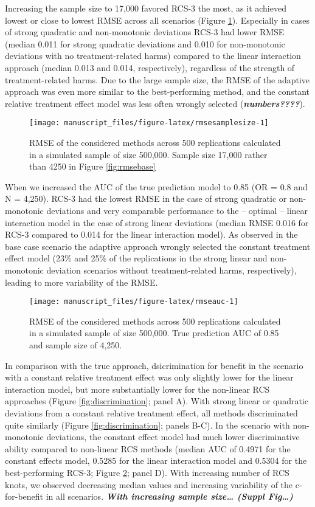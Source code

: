 \documentclass[]{elsarticle} %
\begin{document}
Increasing the sample size to 17,000 favored RCS-3 the most, as it
achieved lowest or close to lowest RMSE across all scenarios (Figure
\ref{fig:rmsesamplesize}). Especially in cases of strong quadratic and
non-monotonic deviations RCS-3 had lower RMSE (median 0.011 for strong
quadratic deviations and 0.010 for non-monotonic deviations with no
treatment-related harms) compared to the linear interaction approach
(median 0.013 and 0.014, respectively), regardless of the strength of
treatment-related harms. Due to the large sample size, the RMSE of the
adaptive approach was even more similar to the best-performing method,
and the constant relative treatment effect model was less often wrongly
selected (\textbf{\emph{numbers????}}).

\begin{figure}
\texttt{[image: manuscript\_files/figure-latex/rmsesamplesize-1]} \caption{RMSE of the considered methods across 500 replications calculated in a simulated sample of size 500,000. Sample size 17,000 rather than 4250 in Figure \ref{fig:rmsebase}}\label{fig:rmsesamplesize}
\end{figure}

When we increased the AUC of the true prediction model to 0.85 (OR = 0.8
and N = 4,250). RCS-3 had the lowest RMSE in the case of strong
quadratic or non-monotonic deviations and very comparable performance to
the -- optimal -- linear interaction model in the case of strong linear
deviations (median RMSE 0.016 for RCS-3 compared to 0.014 for the linear
interaction model). As observed in the base case scenario the adaptive
approach wrongly selected the constant treatment effect model (23\% and
25\% of the replications in the strong linear and non-monotonic
deviation scenarios without treatment-related harms, respectively),
leading to more variability of the RMSE.

\begin{figure}
\texttt{[image: manuscript\_files/figure-latex/rmseauc-1]} \caption{RMSE of the considered methods across 500 replications calculated in a simulated sample of size 500,000. True prediction AUC of 0.85 and sample size of 4,250.}\label{fig:rmseauc}
\end{figure}

In comparison with the true approach, dsicrimination for benefit in the
scenario with a constant relative treatment effect was only slightly
lower for the linear interaction model, but more substantially lower for
the non-linear RCS approaches (Figure \ref{fig:discrimination}; panel
A). With strong linear or quadratic deviations from a constant relative
treatment effect, all methods discriminated quite similarly (Figure
\ref{fig:discrimination}; panels B-C). In the scenario with
non-monotonic deviations, the constant effect model had much lower
discriminative ability compared to non-linear RCS methods (median AUC of
0.4971 for the constant effects model, 0.5285 for the linear interaction
model and 0.5304 for the best-performing RCS-3; Figure
\ref{fig:rmseauc}; panel D). With increasing number of RCS knots, we
observed decreasing median values and increasing variability of the
c-for-benefit in all scenarios. \textbf{\emph{With increasing sample
size\ldots{} (Suppl Fig\ldots)}}
\end{document}
